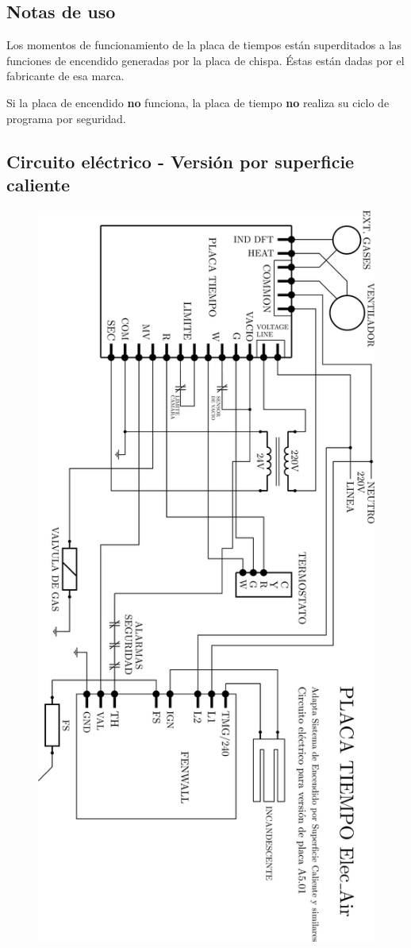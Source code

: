 \documentclass{article}
\begin{document}
\subsection*{Notas de uso}
Los momentos de funcionamiento de la placa de tiempos están superditados a las funciones de encendido generadas por la placa de chispa. Éstas están dadas por el fabricante de esa marca.\par Si la placa de encendido \textbf{no} funciona, la placa de tiempo \textbf{no} realiza su ciclo de programa por seguridad.
\newpage

\newpage

\subsection*{Circuito eléctrico - Versión por superficie caliente}

\begin{figure}[H]
\centering
\includegraphics[width=0.65\linewidth]{images/PlacaTiempo_PlanoFenwallV501.png}
\end{figure}
\end{document}
